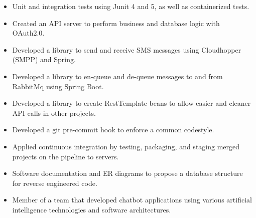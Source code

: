 \documentclass[10pt,a4paper]{altacv}
\begin{document}
\begin{itemize}
    \item Unit and integration tests using Junit 4 and 5, as well as containerized tests.
    \item Created an API server to perform business and database logic with OAuth2.0.
    \item Developed a library to send and receive SMS messages using Cloudhopper (SMPP) and Spring.
    \item Developed a library to en-queue and de-queue messages to and from RabbitMq using Spring Boot.
    \item Developed a library to create RestTemplate beans to allow easier and cleaner API calls in other projects.
    \item Developed a git pre-commit hook to enforce a common codestyle.
    \item Applied continuous integration by testing, packaging, and staging merged projects on the pipeline to servers.
    \item Software documentation and ER diagrams to propose a database structure for reverse engineered code.\\
                 


\divider

   
    
\end{itemize}
\begin{itemize}
\item Member of a team that developed chatbot applications using various artificial intelligence technologies and software architectures.\\

\end{itemize}
\end{document}
